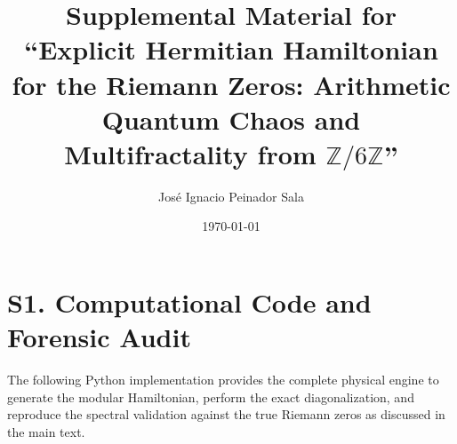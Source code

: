 \documentclass[aps,prl,preprint,superscriptaddress,floatfix]{revtex4-2}
\newcommand{\Zmod}{\mathbb{Z}/6\mathbb{Z}}
\begin{document}
\title{Supplemental Material for \\ ``Explicit Hermitian Hamiltonian for the Riemann Zeros: Arithmetic Quantum Chaos and Multifractality from \texorpdfstring{$\Zmod$}{Z/6Z}''}

\author{José Ignacio Peinador Sala}

\date{\today}

\maketitle

\setcounter{equation}{0}
\setcounter{figure}{0}
\setcounter{table}{0}
\setcounter{section}{0}
\renewcommand{\theequation}{S\arabic{equation}}
\renewcommand{\thefigure}{S\arabic{figure}}
\renewcommand{\thetable}{S\arabic{table}}
\renewcommand{\thesection}{S\arabic{section}}


\section{S1. Computational Code and Forensic Audit}

The following Python implementation provides the complete physical engine to generate the modular Hamiltonian, perform the exact diagonalization, and reproduce the spectral validation against the true Riemann zeros as discussed in the main text.
\end{document}
